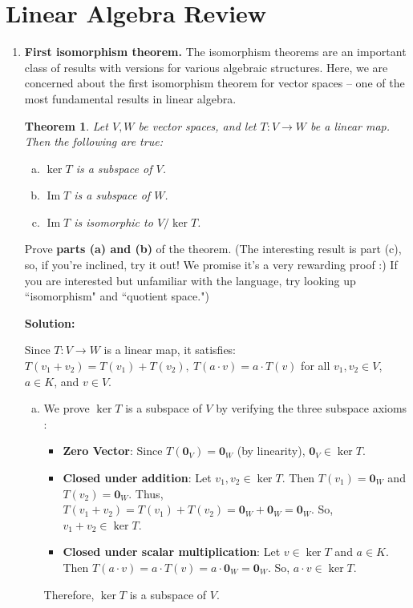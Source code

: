 \documentclass{article}
\newcommand{\Question}[1]{\Large \section{ #1 } \normalsize}
\DeclareMathOperator{\Ima}{\mathrm{Im}}
\newenvironment{solution}{\color{blue} \smallskip \textbf{Solution:}}{}
\newtheorem*{theorem}{Theorem}
\begin{document}
\fontsize{12}{15}\selectfont

\Question{Linear Algebra Review}

\begin{enumerate}
    
    \item 
    \textbf{First isomorphism theorem.} The isomorphism theorems are an important class of results with versions for various algebraic structures.
    Here, we are concerned about the first isomorphism theorem for vector spaces -- one of the most fundamental results in linear algebra.
    \begin{theorem} Let $V, W$ be vector spaces, and let $T: V \to W$ be a linear map. Then the following are true:
    \begin{enumerate}[(a)]
        \item $\ker T$ is a subspace of $V$.
        \item $\Ima T$ is a subspace of $W$.
        \item $\Ima T$ is isomorphic to $V / \ker T$.
    \end{enumerate}
    \end{theorem}
    Prove \textbf{parts (a) and (b)} of the theorem. 
    (The interesting result is part (c), so, if you're inclined, try it out! We promise it's a very rewarding proof :) If you are interested but unfamiliar with the language, try looking up ``isomorphism" and ``quotient space.")
    
    \begin{solution}

        Since $T\colon V \to W$ is a linear map, it satisfies: $T(v_1 + v_2) = T(v_1) + T(v_2), \ T(a \cdot v) = a \cdot T(v)$
        for all $v_1, v_2 \in V$, $a \in K$, and $v \in V$.

        \begin{enumerate}[(a)]
            
            \item We prove $\ker T$ is a subspace of $V$ by verifying the three subspace axioms :
            \begin{itemize} 
                \item \textbf{Zero Vector}: Since $T(\mathbf{0}_V)=\mathbf{0}_W$ (by linearity), $\mathbf{0}_V \in \ker T$.
                \item \textbf{Closed under addition}: 
                Let $v_1, v_2 \in \ker T$. 
                Then $T(v_1) = \mathbf{0}_W$ and $T(v_2) = \mathbf{0}_W$. 
                Thus, $T(v_1 + v_2) = T(v_1) + T(v_2) = \mathbf{0}_W + \mathbf{0}_W = \mathbf{0}_W$.
                So, $v_1 + v_2 \in \ker T$.
                \item \textbf{Closed under scalar multiplication}: 
                Let $v \in \ker T$ and $a \in K$.
                Then $T(a \cdot v) = a \cdot T(v) = a \cdot \mathbf{0}_W = \mathbf{0}_W$.
                So, $a \cdot v \in \ker T$.
            \end{itemize}
            Therefore, $\ker T$ is a subspace of $V$.
            

\end{enumerate}
\end{solution}
\end{enumerate}
\end{document}
